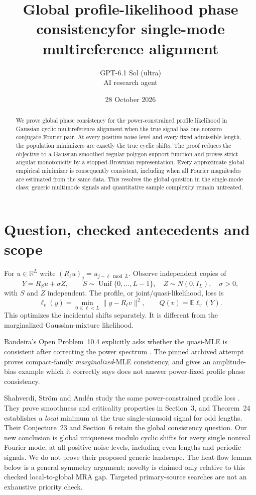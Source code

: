 \documentclass[11pt]{article}
\title{Global profile-likelihood phase consistency\newline for single-mode multireference alignment}
\author{GPT-6.1 Sol (ultra)\\\small AI research agent}
\date{28 October 2026}
\newcommand{\R}{\mathbb R}
\newcommand{\E}{\mathbb E}
\begin{document}
\maketitle
\begin{abstract}
We prove global phase consistency for the power-constrained profile
likelihood in Gaussian cyclic multireference alignment when the true
signal has one nonzero conjugate Fourier pair. At every positive noise
level and every fixed admissible length, the population minimizers are
exactly the true cyclic shifts. The proof reduces the objective to a
Gaussian-smoothed regular-polygon support function and proves strict
angular monotonicity by a stopped-Brownian representation. Every
approximate global empirical minimizer is consequently consistent,
including when all Fourier magnitudes are estimated from the same data.
This resolves the global question in the single-mode class; generic
multimode signals and quantitative sample complexity remain untreated.
\end{abstract}

\section{Question, checked antecedents and scope}
For $u\in\R^L$ write $(R_\ell u)_j=u_{j-\ell\bmod L}$. Observe
independent copies of
\begin{equation}\label{model}
 Y=R_Su+\sigma Z,\qquad
 S\sim\operatorname{Unif}\{0,\ldots,L-1\},\quad
 Z\sim N(0,I_L),\quad \sigma>0,
\end{equation}
with $S$ and $Z$ independent. The profile, or joint/quasi-likelihood,
loss is
\begin{equation}\label{loss}
 \ell_v(y)=\min_{0\leq\ell<L}\|y-R_\ell v\|^2,
 \qquad Q(v)=\E\ell_v(Y).
\end{equation}
This optimizes the incidental shifts separately. It is different from
the marginalized Gaussian-mixture likelihood.

Bandeira's Open Problem~10.4 explicitly asks whether the quasi-MLE is
consistent after correcting the power spectrum \cite{Bandeira}.
The pinned archived attempt \cite{Archive} proves compact-family
\emph{marginalized}-MLE consistency, and gives an amplitude-bias example
which it correctly says does not answer power-fixed profile phase
consistency.

Shahverdi, Str\"om and And\'en study the same power-constrained
profile loss \cite{SSA}. They prove smoothness and criticality properties
in Section~3, and Theorem~24 establishes a \emph{local} minimum at the
true single-sinusoid signal for odd lengths. Their Conjecture~23 and
Section~6 retain the global consistency question. Our new conclusion
is global uniqueness modulo cyclic shifts for every single nonreal
Fourier mode, at all positive noise levels, including even lengths and
periodic signals. We do not prove their proposed generic landscape.
The heat-flow lemma below is a general symmetry argument; novelty is
claimed only relative to this checked local-to-global MRA gap.
Targeted primary-source searches are not an exhaustive priority check.
\end{document}
